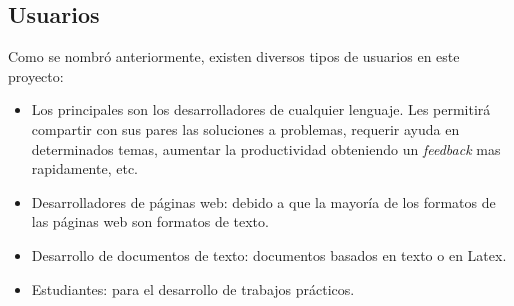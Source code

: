 \documentclass[a4paper,11pt]{article}
\begin{document}
		\subsection{Usuarios}
		    Como se nombr\'o anteriormente, existen diversos tipos de usuarios en este proyecto:

		    \begin{itemize}
				\item 	Los principales son los desarrolladores de cualquier lenguaje. Les permitir\'a
						compartir con sus pares las soluciones a problemas, requerir ayuda en
						determinados temas, aumentar la productividad obteniendo un \textit{feedback} mas
						rapidamente, etc.

				\item 	Desarrolladores de p\'aginas web: debido a que la mayor\'ia de los formatos
						de las páginas web son formatos de texto.

				\item	Desarrollo de documentos de texto: documentos basados en texto o en Latex.

				\item	Estudiantes: para el desarrollo de trabajos prácticos.

		    \end{itemize}
	    
\end{document}
